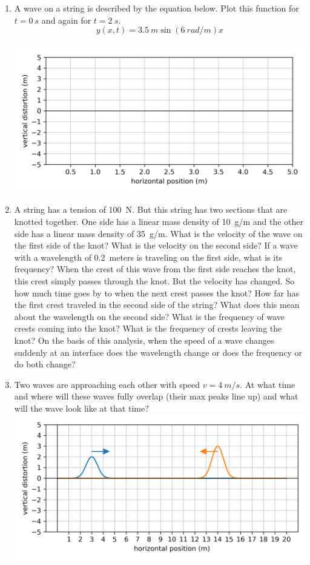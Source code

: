 \begin{enumerate}
	\newpage
	\item 
	A wave on a string is described by the equation below. Plot this function for $t=\SI{0}{s}$ and again for $t=\SI{2}{s}$.
	$$y(x,t)=\SI{3.5}{m}\sin\left(\SI{6}{rad/m}\right) x$$%
	\\
	\includegraphics[scale=1]{week13-blank-plot-2.png}
	
	\newpage
	\item
	A string has a tension of \SI{100}{N}. But this string has two sections that are knotted together. One side has a linear mass density of \SI{10}{g/m} and the other side has a linear mass density of \SI{35}{g/m}. What is the velocity of the wave on the first side of the knot? What is the velocity on the second side? If a wave with a wavelength of \SI{0.2}{meters} is traveling on the first side, what is its frequency? When the crest of this wave from the first side reaches the knot, this crest simply passes through the knot. But the velocity has changed. So how much time goes by to when the next crest passes the knot? How far has the first crest traveled in the second side of the string? What does this mean about the wavelength on the second side? What is the frequency of wave crests coming into the knot? What is the frequency of crests leaving the knot? On the basis of this analysis, when the speed of a wave changes suddenly at an interface does the wavelength change or does the frequency or do both change?
	
	\item
	Two waves are approaching each other with speed $v=\SI{4}{m/s}$. At what time and where will these waves fully overlap (their max peaks line up) and what will the wave look like at that time?\\
	\includegraphics[scale=1]{week13-plot-upright-gauss-pulse.png}
	

\end{enumerate}
